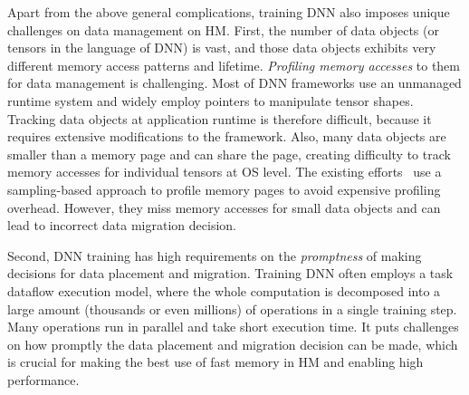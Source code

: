 \textcolor{check}{Apart from the above general complications, training DNN also imposes unique challenges on data management on HM. }
\textcolor{check}{First, the number of data objects (or tensors in the language of DNN) is vast, and those data objects exhibits very different memory access patterns and lifetime. } \textit{Profiling memory accesses} to them for data management is challenging. Most of DNN frameworks use an unmanaged runtime system and widely employ pointers to manipulate tensor shapes.  \textcolor{check}{Tracking data objects at application runtime is therefore difficult, because it requires extensive modifications to the framework.} Also, many data objects are smaller than a memory page and can share the page, creating difficulty to track memory accesses for individual tensors at OS level.  \textcolor{check}{The existing efforts~\cite{Thermostat:asplos17,RAMinate:socc16,heteros:isca17,sc18:wu,unimem:sc17} use a sampling-based approach to profile memory pages to avoid expensive profiling overhead. However, they miss memory accesses for small data objects and can lead to incorrect data migration decision.}

\textcolor{check}{Second, DNN training has high requirements on the \emph{promptness} of making decisions for data placement and migration. } Training DNN often employs a task dataflow execution model, where the whole computation is decomposed into a large amount (thousands or even millions) of operations in a single training step. 
Many operations run in parallel and take short execution time. 
\textcolor{check}{It puts challenges on how promptly the data placement and migration decision can be made, which is crucial for making the best use of fast memory in HM and enabling high performance. }

